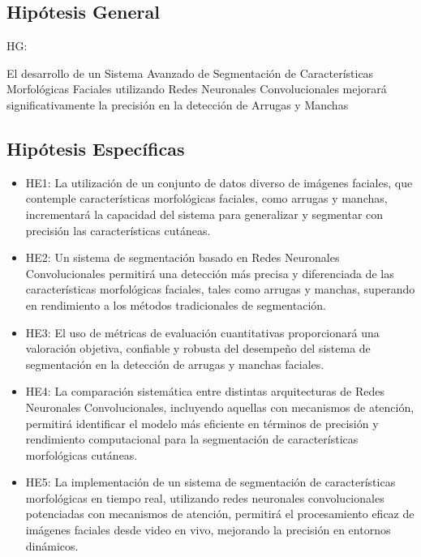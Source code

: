 \subsection{Hipótesis General}
HG: \newcommand{\HipotesisGeneral}{
	El desarrollo de un Sistema Avanzado de Segmentación de Características Morfológicas Faciales utilizando Redes Neuronales Convolucionales mejorará significativamente la precisión en la detección de Arrugas y Manchas}
\HipotesisGeneral


\subsection{Hipótesis Específicas}
\newcommand{\Hone}{
La utilización de un conjunto de datos diverso de imágenes faciales, que contemple características morfológicas faciales, como arrugas y manchas, incrementará la capacidad del sistema para generalizar y segmentar con precisión las características cutáneas.
}
\newcommand{\Htwo}{
Un sistema de segmentación basado en Redes Neuronales Convolucionales permitirá una detección más precisa y diferenciada de las características morfológicas faciales, tales como arrugas y manchas, superando en rendimiento a los métodos tradicionales de segmentación.
}
\newcommand{\Hthree}{
El uso de métricas de evaluación cuantitativas proporcionará una valoración objetiva, confiable y robusta del desempeño del sistema de segmentación en la detección de arrugas y manchas faciales.
}
\newcommand{\Hfour}{
La comparación sistemática entre distintas arquitecturas de Redes Neuronales Convolucionales, incluyendo aquellas con mecanismos de atención, permitirá identificar el modelo más eficiente en términos de precisión y rendimiento computacional para la segmentación de características morfológicas cutáneas.
}
\newcommand{\Hfive}{
La implementación de un sistema de segmentación de características morfológicas en tiempo real, utilizando redes neuronales convolucionales potenciadas con mecanismos de atención, permitirá el procesamiento eficaz de imágenes faciales desde video en vivo, mejorando la precisión en entornos dinámicos.
}

\begin{itemize}
	\item HE1: {\Hone}
	\item HE2: {\Htwo}
	\item HE3: {\Hthree}
	\item HE4: {\Hfour}
	\item HE5: {\Hfive}
\end{itemize}